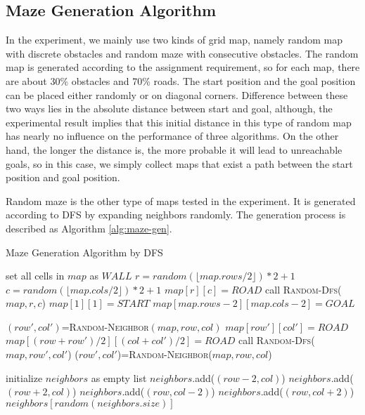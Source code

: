 \subsection{Maze Generation Algorithm}

In the experiment, we mainly use two kinds of grid map, namely random map with 
discrete obstacles and random maze with consecutive obstacles. The random map is
generated according to the assignment requirement, so for each map, there are about
30\% obstacles and 70\% roads. The start position and the goal position can be 
placed either randomly or on diagonal corners. Difference between these two ways 
lies in the absolute distance between start and goal, although, the experimental
result implies that this initial distance in this type of random map has nearly 
no influence on the performance of three algorithms. On the other hand, the 
longer the distance is, the more probable it will lead to unreachable goals, so 
in this case, we simply collect maps that exist a path between the start position
and goal position.

Random maze is the other type of maps tested in the experiment. It is generated
according to DFS by expanding neighbors randomly. The generation process is 
described as Algorithm \ref{alg:maze-gen}.

\begin{algorithm}[ht!]
\caption{Maze Generation Algorithm by DFS}
\label{alg:maze-gen}
\begin{algorithmic}[1]
  \State set all cells in $map$ as $WALL$
  \State $r=random(\lfloor map.rows/2 \rfloor) * 2 + 1$
  \State $c=random(\lfloor map.cols/2 \rfloor) * 2 + 1$
  \State $map[r][c] = ROAD$
  \State call \textsc{Random-Dfs}($map, r, c$)
  \State $map[1][1] = START$
  \State $map[map.rows-2][map.cols-2] = GOAL$
\EndFunction
\end{algorithmic}
\begin{algorithmic}[1]
  \State $(row',col')$=\textsc{Random-Neighbor}$(map, row, col)$
    \State $map[row'][col']=ROAD$
    \State $map[(row+row')/2][(col+col')/2]=ROAD$
    \State call \textsc{Random-Dfs}($map, row', col'$)
    \State ($row',col'$)=\textsc{Random-Neighbor}($map, row, col$)
  \EndWhile
\EndFunction
\end{algorithmic}
\begin{algorithmic}[1]
  \State initialize $neighbors$ as empty list
    \State $neighbors$.add($(row-2, col)$)
  \EndIf
    \State $neighbors$.add($(row+2, col)$)
  \EndIf
    \State $neighbors$.add($(row, col-2)$)
  \EndIf
    \State $neighbors$.add($(row, col+2)$)
  \EndIf
  \Return $neighbors[random(neighbors.size)]$
\EndFunction
\end{algorithmic}
\end{algorithm}

